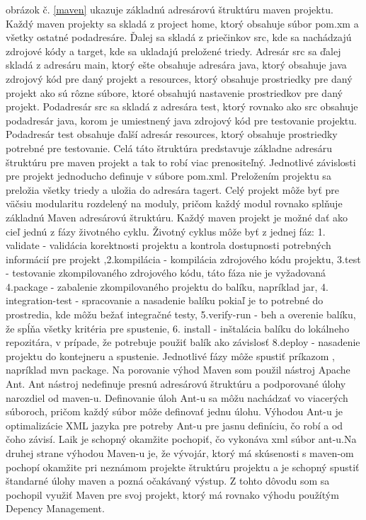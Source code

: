obrázok č. \ref{maven} ukazuje základnú adresárovú štruktúru maven projektu. Každý maven projekty sa skladá z project home, ktorý obsahuje súbor pom.xm a všetky ostatné podadresáre. Ďalej sa skladá z priečinkov src, kde sa nachádzajú zdrojové kódy a target, kde sa ukladajú preložené triedy\cite{mavenbook}. Adresár src sa ďalej skladá z adresáru main, ktorý ešte obsahuje adresára java, ktorý obsahuje java zdrojový kód pre daný projekt a resources, ktorý obsahuje prostriedky pre daný projekt ako sú rôzne súbore, ktoré obsahujú nastavenie prostriedkov pre daný projekt. Podadresár src sa skladá z adresára test, ktorý rovnako ako src obsahuje podadresár java, korom je umiestnený java zdrojový kód pre testovanie projektu. Podadresár test obsahuje ďalší adresár resources, ktorý obsahuje prostriedky potrebné pre testovanie. Celá táto štruktúra predstavuje základne adresáru štruktúru pre maven projekt a tak to robí viac prenositeľný. Jednotlivé závislosti pre projekt jednoducho definuje v súbore pom.xml. Preložením projektu sa preložia všetky triedy a uložia do adresára tagert. Celý projekt môže byť pre väčsiu modularitu rozdelený na moduly, pričom každý modul rovnako splňuje základnú Maven adresárovú štruktúru. Každý maven projekt je možné dať ako cieľ jednú z fázy životného cyklu. Životný cyklus môže byť z jednej fáz: 1. validate - validácia korektnosti projektu a kontrola dostupnosti potrebných informácií pre projekt ,2.kompilácia - kompilácia zdrojového kódu projektu, 3.test - testovanie zkompilovaného zdrojového kódu, táto fáza nie je vyžadovaná 4.package - zabalenie zkompilovaného projektu do balíku, napríklad jar, 4. integration-test - spracovanie a nasadenie balíku pokiaľ je to potrebné do prostredia, kde môžu bežať integračné testy, 5.verify-run - beh a overenie balíku, že spĺňa všetky kritéria pre spustenie, 6. install - inštalácia balíku do lokálneho repozitára, v prípade, že potrebuje použiť balík ako závislosť 8.deploy - nasadenie projektu do kontejneru a spustenie.
Jednotlivé fázy môže spustiť príkazom , napríklad mvn package. Na porovanie výhod Maven som použil nástroj Apache Ant. Ant nástroj nedefinuje presnú adresárovú štruktúru a podporované úlohy narozdiel od maven-u. Definovanie úloh Ant-u sa môžu nachádzať vo viacerých súboroch, pričom každý súbor môže definovať jednu úlohu. Výhodou Ant-u je optimalizácie XML jazyka pre potreby Ant-u pre jasnu definíciu, čo robí a od čoho závisí. Laik je schopný okamžite pochopiť, čo vykonáva xml súbor ant-u.Na druhej strane výhodou Maven-u je, že vývojár, ktorý má skúsenosti s maven-om pochopí okamžite pri neznámom projekte štruktúru projektu a je schopný spustiť štandarné úlohy maven a pozná očakávaný výstup. Z tohto dôvodu som sa pochopil využiť Maven pre svoj projekt, ktorý má rovnako výhodu použítým Depency Management.


